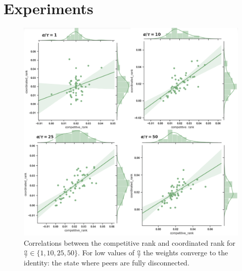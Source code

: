 \documentclass{article}
\begin{document}
\section{Experiments}
\label{experiments}
\begin{figure}[!htb]
	\centering
	\includegraphics[scale=.3]{images/c_vs_c_nice.png}
	\caption{Correlations between the competitive rank and coordinated rank for $\frac{\alpha}{\tau} \in \{1, 10, 25, 50\}$. For low values of $\frac{\alpha}{\tau}$ the weights converge to the identity: the state where peers are fully disconnected. }
	\label{coordvscomp}
\end{figure}
\end{document}
